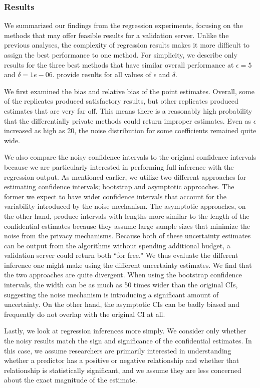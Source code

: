 \subsubsection{Results}

We summarized our findings from the regression experiments, focusing on the methods that may offer feasible results for a validation server. Unlike the previous analyses, the complexity of regression results makes it more difficult to assign the best performance to one method. For simplicity, we describe only results for the three best methods that have similar overall performance at $\epsilon = 5$ and $\delta = 1e-06$. \citet{barrientos2021} provide results for all values of $\epsilon$ and $\delta$.

We first examined the bias and relative bias of the point estimates. Overall, some of the replicates produced satisfactory results, but other replicates produced estimates that are very far off. This means there is a reasonably high probability that the differentially private methods could return improper estimates. Even as $\epsilon$ increased as high as 20, the noise distribution for some coefficients remained quite wide.

We also compare the noisy confidence intervals to the original confidence intervals because we are particularly interested in performing full inference with the regression output. As mentioned earlier, we utilize two different approaches for estimating confidence intervals; bootstrap and asymptotic approaches. The former we expect to have wider confidence intervals that account for the variability introduced by the noise mechanism. The asymptotic approaches, on the other hand, produce intervals with lengths more similar to the length of the confidential estimates because they assume large sample sizes that minimize the noise from the privacy mechanisms. Because both of these uncertainty estimates can be output from the algorithms without spending additional budget, a validation server could return both ``for free." We thus evaluate the different inference one might make using the different uncertainty estimates. We find that the two approaches are quite divergent. When using the bootstrap confidence intervals, the width can be as much as 50 times wider than the original CIs, suggesting the noise mechanism is introducing a significant amount of uncertainty. On the other hand, the asymptotic CIs can be badly biased and frequently do not overlap with the original CI at all.

Lastly, we look at regression inferences more simply. We consider only whether the noisy results match the sign and significance of the confidential estimates. In this case, we assume researchers are primarily interested in understanding whether a predictor has a positive or negative relationship and whether that relationship is statistically significant, and we assume they are less concerned about the exact magnitude of the estimate.

